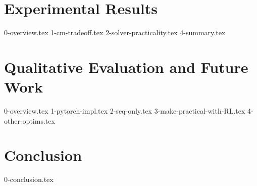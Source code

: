 \documentclass[12pt,twoside]{report}
\begin{document}
\chapter{Experimental Results} \label{ch:4-experiments}
{0-overview.tex}
{1-cm-tradeoff.tex}
{2-solver-practicality.tex}
{4-summary.tex}

\chapter{Qualitative Evaluation and Future Work}
{0-overview.tex}
{1-pytorch-impl.tex}
{2-seq-only.tex}
{3-make-practical-with-RL.tex}
{4-other-optims.tex}

\chapter{Conclusion}
{0-conclusion.tex}


\end{document}
